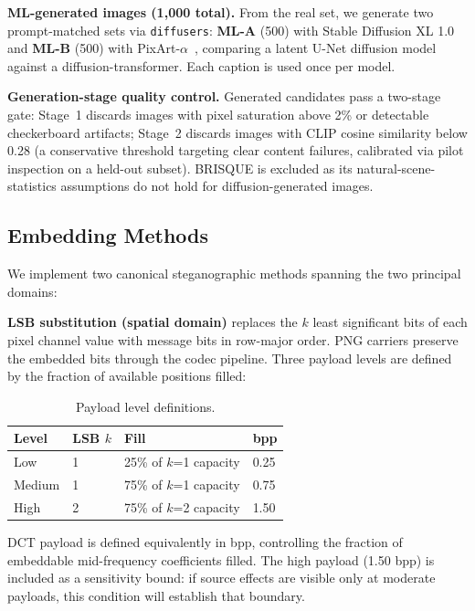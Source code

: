 \documentclass[10pt,twocolumn,a4paper]{article}
\begin{document}
\textbf{ML-generated images (1{,}000 total).} From the real set, we generate two prompt-matched sets via \texttt{diffusers}: \textbf{ML-A} (500) with Stable Diffusion XL 1.0~\cite{sdxl2023} and \textbf{ML-B} (500) with PixArt-$\alpha$~\cite{pixart2023}, comparing a latent U-Net diffusion model against a diffusion-transformer. Each caption is used once per model.

\textbf{Generation-stage quality control.} Generated candidates pass a two-stage gate: Stage~1 discards images with pixel saturation above 2\% or detectable checkerboard artifacts; Stage~2 discards images with CLIP cosine similarity below 0.28 (a conservative threshold targeting clear content failures, calibrated via pilot inspection on a held-out subset). BRISQUE is excluded as its natural-scene-statistics assumptions do not hold for diffusion-generated images.

\subsection{Embedding Methods}

We implement two canonical steganographic methods spanning the two principal domains:

\textbf{LSB substitution (spatial domain)} replaces the $k$ least significant bits of each pixel channel value with message bits in row-major order. PNG carriers preserve the embedded bits through the codec pipeline. Three payload levels are defined by the fraction of available positions filled:

\begin{table}[h]
\centering
\caption{Payload level definitions.}
\label{tab:payload}
\scriptsize
\setlength{\tabcolsep}{4pt}
\begin{tabular}{@{}llll@{}}
\toprule
\textbf{Level} & \textbf{LSB $k$} & \textbf{Fill} & \textbf{bpp} \\
\midrule
Low    & 1 & 25\% of $k$=1 capacity & 0.25 \\
Medium & 1 & 75\% of $k$=1 capacity & 0.75 \\
High   & 2 & 75\% of $k$=2 capacity & 1.50 \\
\bottomrule
\end{tabular}
\end{table}

\noindent DCT payload is defined equivalently in bpp, controlling the fraction of embeddable mid-frequency coefficients filled. The high payload (1.50 bpp) is included as a sensitivity bound: if source effects are visible only at moderate payloads, this condition will establish that boundary.
\end{document}
